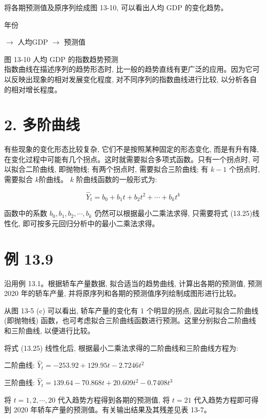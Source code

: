 \documentclass[10pt]{article}
\begin{document}
\begin{CJK*}{UTF8}{bsmi}
将各期预测值及原序列绘成图 13-10, 可以看出人均 GDP 的变化趋势。

\begin{center}
\end{center}

年份

$\rightarrow$ 人均GDP $\rightarrow$ 预测值

图 13-10 人均 GDP 的指数趋势预测\\
指数曲线在描述序列的趋势形态时, 比一般的趋势直线有更广泛的应用。因为它可以反映出现象的相对发展变化程度, 对不同序列的指数曲线进行比较, 以分析各自的相对增长程度。

\section*{2. 多阶曲线}
有些现象的变化形态比较复杂, 它们不是按照某种固定的形态变化, 而是有升有降,在变化过程中可能有几个拐点。这时就需要拟合多项式函数。只有一个拐点时, 可以拟合二阶曲线, 即抛物线; 有两个拐点时, 需要拟合三阶曲线; 有 $k-1$ 个拐点时, 需要拟合 $k$阶曲线。 $k$ 阶曲线函数的一般形式为:


\begin{equation*}
\hat{Y}_{t}=b_{0}+b_{1} t+b_{2} t^{2}+\cdots+b_{k} t^{k} \tag{13.25}
\end{equation*}


函数中的系数 $b_{0}, b_{1}, b_{2}, \cdots, b_{k}$ 仍然可以根据最小二乘法求得, 只需要将式 (13.25)线性化, 即可按多元回归分析中的最小二乘法求得。

\section*{例 13.9}
沿用例 13.1。根据轿车产量数据, 拟合适当的趋势曲线, 计算出各期的预测值, 预测 2020 年的轿车产量, 并将原序列和各期的预测值序列绘制成图形进行比较。

从图 13-5 (c) 可以看出, 轿车产量的变化有 1 个明显的拐点, 因此可拟合二阶曲线 (即抛物线) 函数，也可考虑拟合三阶曲线函数进行预测。这里分别拟合二阶曲线和三阶曲线, 以便进行比较。

将式 (13.25) 线性化后, 根据最小二乘法求得的二阶曲线和三阶曲线方程为:

二阶曲线: $\hat{Y}_{t}=-253.92+129.95 t-2.7246 t^{2}$

三阶曲线: $\hat{Y}_{t}=139.64-70.868 t+20.609 t^{2}-0.7408 t^{3}$

将 $t=1,2, \cdots, 20$ 代入趋势方程得到各期的预测值, 将 $t=21$ 代入趋势方程即可得到 2020 年轿车产量的预测值。有关输出结果及其残差见表 13-7。


\end{CJK*}
\end{document}
